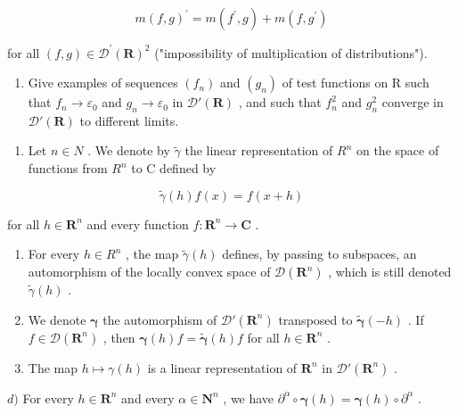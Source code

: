 \[
m (f, g) ^ {\prime} = m \left(f ^ {\prime}, g\right) + m \left(f, g ^ {\prime}\right)
\]

for all \((f,g)\in\mathcal{D}^{\prime}(\mathbf{R})^{2}\) ("impossibility of multiplication of distributions").

\begin{enumerate}
\def\labelenumi{\alph{enumi})}
\setcounter{enumi}{3}
\tightlist
\item
  Give examples of sequences \((f_{n})\) and \((g_{n})\) of test functions on R such that \(f_{n} \to \varepsilon_{0}\) and \(g_{n} \to \varepsilon_{0}\) in \(\mathcal{D}'(\mathbf{R})\) , and such that \(f_{n}^{2}\) and \(g_{n}^{2}\) converge in \(\mathcal{D}'(\mathbf{R})\) to different limits.
\end{enumerate}

\begin{enumerate}
\def\labelenumi{\arabic{enumi})}
\setcounter{enumi}{6}
\tightlist
\item
  Let \(n \in N\) . We denote by \(\widetilde{\gamma}\) the linear representation of \(R^{n}\) on the space of functions from \(R^{n}\) to C defined by
\end{enumerate}

\[
\widetilde {\gamma} (h) f (x) = f (x + h)
\]

for all \(h \in \mathbf{R}^n\) and every function \(f: \mathbf{R}^n \to \mathbf{C}\) .

\begin{enumerate}
\def\labelenumi{\alph{enumi})}
\item
  For every \(h \in R^{n}\) , the map \(\widetilde{\gamma}(h)\) defines, by passing to subspaces, an automorphism of the locally convex space of \(\mathcal{D}(\mathbf{R}^{n})\) , which is still denoted \(\widetilde{\gamma}(h)\) .
\item
  We denote \(\pmb{\gamma}\) the automorphism of \(\mathcal{D}'(\mathbf{R}^n)\) transposed to \(\widetilde{\pmb{\gamma}}(-h)\) . If \(f \in \mathcal{D}(\mathbf{R}^n)\) , then \(\pmb{\gamma}(h)f = \widetilde{\pmb{\gamma}}(h)f\) for all \(h \in \mathbf{R}^n\) .
\item
  The map \(h \mapsto \gamma(h)\) is a linear representation of \(\mathbf{R}^{n}\) in \(\mathcal{D}'(\mathbf{R}^{n})\) .
\end{enumerate}

\(d)\) For every \(h \in \mathbf{R}^n\) and every \(\alpha \in \mathbf{N}^n\) , we have \(\partial^\alpha \circ \boldsymbol{\gamma}(h) = \boldsymbol{\gamma}(h) \circ \partial^\alpha\) .

